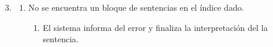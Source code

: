 \begin{framed}
\begin{description}
\begin{enumerate}
   \setcounter{enumi}{2}
   \renewcommand{\labelenumi}{}
   \renewcommand{\labelenumiii}{\arabic{enumiii}.}
   \renewcommand{\labelenumii}{\arabic{enumi}\alph{enumii}.}
      \item 
      \begin {enumerate}
         \setcounter{enumii}{0}
         \item No se encuentra un bloque de sentencias en el índice dado.
         \begin{enumerate}
         \item El sistema informa del error y finaliza la interpretación del 
         la sentencia.
         \end{enumerate}
      \end{enumerate}
   \end{enumerate}
\end{description}
 \FloatBarrier
\end{framed}
